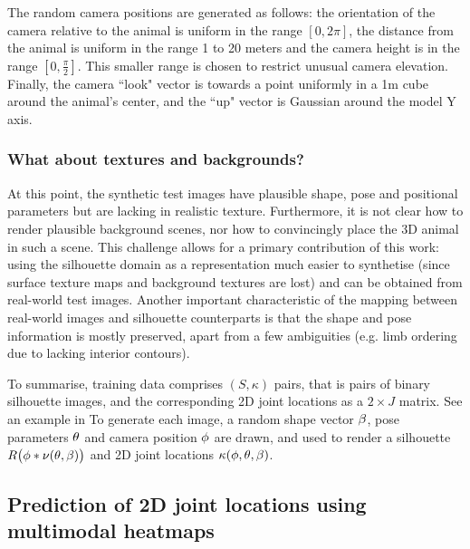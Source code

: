 The random camera positions are generated as follows: the orientation of the camera relative to the animal is uniform in the range $[0, 2\pi]$, the distance from the animal is uniform in the range 1 to 20 meters and the camera height is in the range $[0,\frac{\pi}{2}]$. This smaller range is chosen to restrict unusual camera elevation. Finally, the camera ``look" vector is towards a point uniformly in a 1m cube around the animal's center, and the ``up" vector is Gaussian around the model Y axis.

\subsubsection{What about textures and backgrounds?} 

At this point, the synthetic test images have plausible shape, pose and positional parameters but are lacking in realistic texture. Furthermore, it is not clear how to render plausible background scenes, nor how to convincingly place the 3D animal in such a scene. This challenge allows for a primary contribution of this work: using the silhouette domain as a representation much easier to synthetise (since surface texture maps and background textures are lost) and can be obtained from real-world test images. Another important characteristic of the mapping between real-world images and silhouette counterparts is that the shape and pose information is mostly preserved, apart from a few ambiguities (e.g. limb ordering due to lacking interior contours). 

To summarise, training data comprises $(S, \kappa)$ pairs, that is pairs of binary silhouette images, and the corresponding 2D joint locations as a $2\times J$ matrix. See an example in   To generate each image, a random shape vector $\beta$, pose parameters $\theta$ and camera position $\phi$ are drawn, and used to render a silhouette $R\bigl(\phi * \nu(\theta, \beta)\bigr)$ and 2D joint locations $\kappa(\phi,\theta,\beta)$.



\subsection{Prediction of 2D joint locations using multimodal heatmaps}



